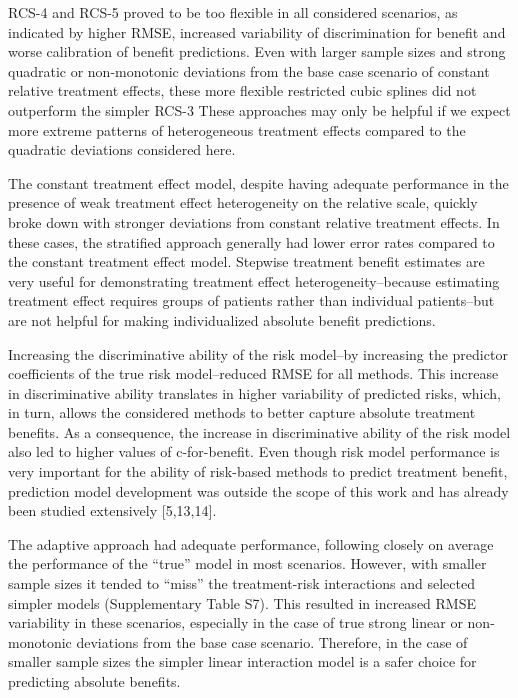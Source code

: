 \documentclass[]{elsarticle} %
\begin{document}
RCS-4 and RCS-5 proved to be too flexible in all considered scenarios,
as indicated by higher RMSE, increased variability of discrimination for
benefit and worse calibration of benefit predictions. Even with larger
sample sizes and strong quadratic or non-monotonic deviations from the
base case scenario of constant relative treatment effects, these more
flexible restricted cubic splines did not outperform the simpler RCS-3
These approaches may only be helpful if we expect more extreme patterns
of heterogeneous treatment effects compared to the quadratic deviations
considered here.

The constant treatment effect model, despite having adequate performance
in the presence of weak treatment effect heterogeneity on the relative
scale, quickly broke down with stronger deviations from constant
relative treatment effects. In these cases, the stratified approach
generally had lower error rates compared to the constant treatment
effect model. Stepwise treatment benefit estimates are very useful for
demonstrating treatment effect heterogeneity--because estimating
treatment effect requires groups of patients rather than individual
patients--but are not helpful for making individualized absolute benefit
predictions.

Increasing the discriminative ability of the risk model--by increasing
the predictor coefficients of the true risk model--reduced RMSE for all
methods. This increase in discriminative ability translates in higher
variability of predicted risks, which, in turn, allows the considered
methods to better capture absolute treatment benefits. As a consequence,
the increase in discriminative ability of the risk model also led to
higher values of c-for-benefit. Even though risk model performance is
very important for the ability of risk-based methods to predict
treatment benefit, prediction model development was outside the scope of
this work and has already been studied extensively {[}5,13,14{]}.

The adaptive approach had adequate performance, following closely on
average the performance of the ``true'' model in most scenarios.
However, with smaller sample sizes it tended to ``miss'' the
treatment-risk interactions and selected simpler models (Supplementary
Table S7). This resulted in increased RMSE variability in these
scenarios, especially in the case of true strong linear or non-monotonic
deviations from the base case scenario. Therefore, in the case of
smaller sample sizes the simpler linear interaction model is a safer
choice for predicting absolute benefits.
\end{document}
